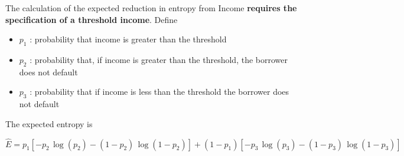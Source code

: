 \documentclass[11pt]{article}
\providecommand{\tightlist}{%
      \setlength{\itemsep}{0pt}\setlength{\parskip}{0pt}}
\begin{document}
    The calculation of the expected reduction in entropy from Income
\textbf{requires the specification of a threshold income}. Define

\begin{itemize}
\tightlist
\item
  \(p_1\) : probability that income is greater than the threshold
\item
  \(p_2\) : probability that, if income is greater than the threshold,
  the borrower does not default
\item
  \(p_3\) : probability that if income is less than the threshold the
  borrower does not default
\end{itemize}

The expected entropy is

\[\hat E = p_1\left[ -p_2 \, \log(p_2) - (1-p_2)\, \log(1-p_2) \right] + (1-p_1)\left[-p_3\, \log(p_3) - (1-p_3)\,\log(1-p_3)\right]\]
\end{document}
